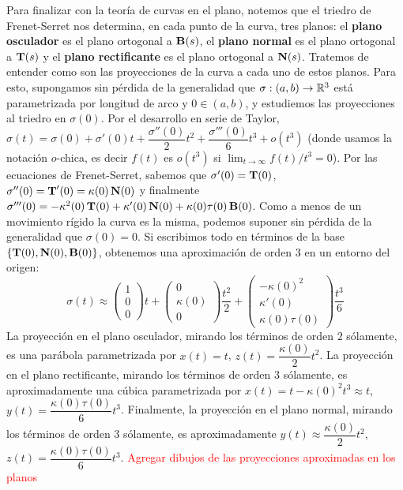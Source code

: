 Para finalizar con la teoría de curvas en el plano, notemos que el triedro de Frenet-Serret nos determina, en cada punto de la curva, tres planos: el \textbf{plano osculador} es el plano ortogonal a $\operatorname{\mathbf{B}}(s)$, el \textbf{plano normal} es el plano ortogonal a $\operatorname{\mathbf{T}}(s)$ y el \textbf{plano rectificante} es el plano ortogonal a $\operatorname{\mathbf{N}}(s)$. Tratemos de entender como son las proyecciones de la curva a cada uno de estos planos. Para esto, supongamos sin pérdida de la generalidad que $\sigma:(a,b)\to\mathbb{R}^3$ está parametrizada por longitud de arco y $0\in (a,b)$, y estudiemos las proyecciones al triedro en $\sigma(0)$. Por el desarrollo en serie de Taylor, $\sigma(t)=\sigma(0)+\sigma'(0)t + \dfrac{\sigma''(0)}{2}t^2 + \dfrac{\sigma'''(0)}{6}t^3+ o(t^3)$ (donde usamos la notación $o$-chica, es decir $f(t)$ es $o(t^3)$ si $\displaystyle\lim_{t\to\infty}f(t)/t^3=0$). Por las ecuaciones de Frenet-Serret, sabemos que $\sigma'(0)=\operatorname{\mathbf{T}}(0)$, $\sigma''(0)=\operatorname{\mathbf{T}}'(0)=\kappa(0)\operatorname{\mathbf{N}}(0)$ y finalmente $\sigma'''(0)=-\kappa^2(0)\operatorname{\mathbf{T}}(0)+\kappa'(0)\operatorname{\mathbf{N}}(0) + \kappa(0)\tau(0)\operatorname{\mathbf{B}}(0)$. Como a menos de un movimiento rígido la curva es la misma, podemos suponer sin pérdida de la generalidad que $\sigma(0)=0$. Si escribimos todo en términos de la base $\{\operatorname{\mathbf{T}}(0),\operatorname{\mathbf{N}}(0),\operatorname{\mathbf{B}}(0)\}$, obtenemos una aproximación de orden $3$ en un entorno del origen: $$\sigma(t)\approx\begin{pmatrix}1\\ 0\\ 0\end{pmatrix}t + \begin{pmatrix}0\\ \kappa(0)\\ 0\end{pmatrix}\dfrac{t^2}{2} + \begin{pmatrix}-\kappa(0)^2\\ \kappa'(0) \\ \kappa(0)\tau(0)\end{pmatrix}\dfrac{t^3}{6}$$
La proyección en el plano osculador, mirando los términos de orden $2$ sólamente, es una parábola parametrizada por $x(t)=t$, $z(t)=\dfrac{\kappa(0)}{2}t^2$. La proyección en el plano rectificante, mirando los términos de orden $3$ sólamente, es aproximadamente una cúbica parametrizada por $x(t)=t-\kappa(0)^2 t^3\approx t$, $y(t)=\dfrac{\kappa(0)\tau(0)}{6}t^3$. Finalmente, la proyección en el plano normal, mirando los términos de orden $3$ sólamente, es aproximadamente $y(t)\approx\dfrac{\kappa(0)}{2}t^2$, $z(t)=\dfrac{\kappa(0)\tau(0)}{6}t^3$. \textcolor{red}{Agregar dibujos de las proyecciones aproximadas en los planos}
